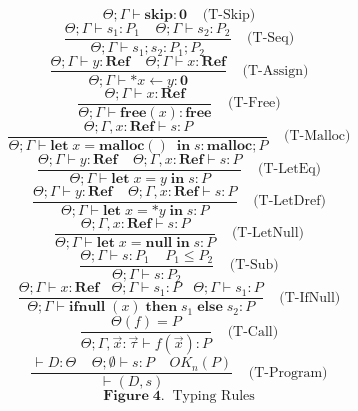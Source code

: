 \documentclass[english]{jssst_ppl} %
\newcommand\LET{\mathbf{let}\;}
\newcommand\IN{\mathbf{in}\;}
\newcommand\SKIP{\mathbf{skip}}
\newcommand\Rtab{\; \; \; \;}
\newcommand\IFNULL{\mathbf{ifnull}\;}
\newcommand\THEN{\mathbf{then}\;}
\newcommand\ELSE{\mathbf{else}\;}
\newcommand\MALLOC{\mathbf{malloc()}\;}
\newcommand\Malloc{\mathbf{malloc}}
\newcommand\Free{\mathbf{free}}
\theoremstyle{definition}
\begin{document}
$$
         \Theta ; \Gamma \vdash \SKIP : \mathbf{0}
      \Rtab \mbox{(T-Skip)}
$$
$$
      \frac{\Theta ; \Gamma \vdash s_{1} : P_{1} \Rtab \Theta ; \Gamma \vdash s_{2} : P_{2}}
          {\Theta ; \Gamma \vdash s_{1} ; s_{2} : P_{1};P_{2} }
     \Rtab \mbox{(T-Seq)}
$$
$$
     \frac{\Theta ; \Gamma \vdash y :  \mathbf{Ref} \Rtab \Theta ; \Gamma \vdash x : \mathbf{Ref} }
          {\Theta ; \Gamma \vdash *x \leftarrow y : \mathbf{0} }
     \Rtab \mbox{(T-Assign)}
$$
$$
     \frac{\Theta ; \Gamma \vdash x : \mathbf{Ref} }
           {\Theta ; \Gamma \vdash \Free(x) : \Free}
     \Rtab \mbox{(T-Free)}
$$
$$
     \frac{\Theta ; \Gamma,x : \mathbf{Ref} \vdash s : P}
           {\Theta ; \Gamma \vdash \LET x = \MALLOC \; \IN s  : \Malloc;P}
           \Rtab \mbox{(T-Malloc)}
$$
$$
     \frac{\Theta ; \Gamma \vdash y : \mathbf{Ref}  \Rtab \Theta ; \Gamma , x : \mathbf{Ref} \vdash s : P}
           {\Theta ; \Gamma \vdash \LET x = y \; \IN s : P}
     \Rtab \mbox{(T-LetEq)}
$$
$$
     \frac{\Theta ; \Gamma \vdash y : \mathbf{Ref}  \Rtab \Theta ; \Gamma , x : \mathbf{Ref} \vdash s : P}
           {\Theta ; \Gamma \vdash \LET x = *y \; \IN s : P}
     \Rtab \mbox{(T-LetDref)}
$$
$$
     \frac{\Theta ; \Gamma, x : \mathbf{Ref} \vdash s : P}
           {\Theta ; \Gamma \vdash \LET x = \mathbf{null} \; \IN s : P}
     \Rtab \mbox{(T-LetNull)}
$$
$$
     \frac{\Theta ; \Gamma \vdash s : P_{1} \Rtab P_{1} \le P_{2}}
            {\Theta ; \Gamma \vdash s : P_{2}}
     \Rtab \mbox{(T-Sub)}
$$
$$
     \frac{\Theta ; \Gamma \vdash x : \mathbf{Ref}   \ \ \ \  \Theta ; \Gamma \vdash s_{1} : P \ \ \ \ \Theta ; \Gamma \vdash s_{1} : P}
           {\Theta ; \Gamma \vdash \IFNULL(x) \; \THEN s_{1}\; \ELSE s_{2} : P}
     \Rtab \mbox{(T-IfNull)}
$$
$$ \frac{ \Theta(f) = P}
{\Theta; \Gamma, \vec{x} : \vec{\tau} \vdash f(\vec{x}) : P}
\Rtab \mbox{(T-Call)} $$
$$\frac{\vdash D : \Theta \;\;\;\; \Theta; \emptyset\vdash s : P \Rtab OK_{n}(P)}
{\vdash (D, s)}
\Rtab \mbox{(T-Program)} $$
$$
    \mathbf{Figure \; 4.} \;\;\mbox{Typing Rules}
$$
\end{document}
